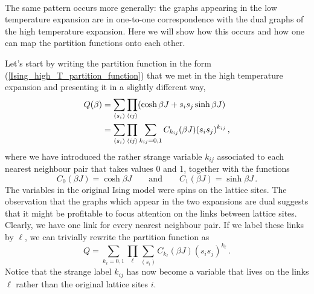 \documentclass{article}
\theoremstyle{plain}\theoremheaderfont{\normalfont\bfseries}\theorembodyfont{\rmfamily}\theoremseparator{.}\newtheorem*{thm}{Theorem}\newtheorem*{law}{Law}\newtheorem*{pos}{Postulate}
\numberwithin{equation}{section}
\begin{document}
    \\The same pattern occurs more generally: the graphs appearing in the low temperature expansion are in one-to-one correspondence with the dual graphs of the high temperature expansion. Here we will show how this occurs and how one can map the partition functions onto each other.
    
    Let's start by writing the partition function in the form (\ref{Ising_high_T_partition_function}) that we met in the high temperature expansion and presenting it in a slightly different way,
    \begin{align}
        Q(\beta)&=\sum_{(s_i)}\prod_{\langle ij\rangle}(\cosh\beta J+s_i s_j\sinh\beta J)\notag\\
        &=\sum_{(s_i)}\prod_{\langle ij\rangle}\sum_{k_{ij}=0,1}C_{k_{ij}}(\beta J)(s_i s_j)^{k_{ij}}\,,
    \end{align}
    where we have introduced the rather strange variable \(k_{ij}\) associated to each nearest neighbour pair that takes values 0 and 1, together with the functions
    \begin{equation}
        C_0(\beta J)=\cosh\beta J\qquad\text{and}\qquad C_1(\beta J)=\sinh\beta J\,.
    \end{equation}
    The variables in the original Ising model were spins on the lattice sites. The observation that the graphs which appear in the two expansions are dual suggests that it might be profitable to focus attention on the links between lattice sites. Clearly, we have one link for every nearest neighbour pair. If we label these links by \(\ell\), we can trivially rewrite the partition function as
    \begin{equation}
        Q=\sum_{k_\ell=0,1}\prod_{\ell}\sum_{(s_i)}C_{k_\ell}(\beta J)(s_is_j)^{k_\ell}\,.
    \end{equation}
    Notice that the strange label \(k_{ij}\) has now become a variable that lives on the links \(\ell\) rather than the original lattice sites \(i\).
\end{document}
